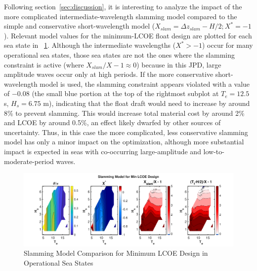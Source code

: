 Following section~\ref{sec:discussion}, it is interesting to analyze the impact of the more complicated intermediate-wavelength slamming model compared to the simple and conservative short-wavelength model ($X_{slam}=\Delta z_{slam}-H/2; X^*=-1$).
Relevant model values for the minimum-LCOE float design are plotted for each sea state in \figureautorefname~\ref{fig:slamming-validation}.
Although the intermediate wavelengths ($X^*>-1$) occur for many operational sea states, those sea states are not the ones where the slamming constraint is active (where $X_{slam}/X-1 \approx 0$) because in this JPD, large amplitude waves occur only at high periods.
If the more conservative short-wavelength model is used, the slamming constraint appears violated with a value of $-0.08$ (the small blue portion at the top of the rightmost subplot at $T_e=12.5$ s, $H_s=6.75$ m), indicating that the float draft would need to increase by around 8\% to prevent slamming.
This would increase total material cost by around 2\% and LCOE by around 0.5\%, an effect likely dwarfed by other sources of uncertainty.
Thus, in this case the more complicated, less conservative slamming model has only a minor impact on the optimization, although more substantial impact is expected in seas with co-occurring large-amplitude and low-to-moderate-period waves. 
\begin{figure}
    \centering
    \includegraphics[width=1\linewidth]{figs/slam_validation.pdf}
    \caption{Slamming Model Comparison for Minimum LCOE Design in Operational Sea States}
    \label{fig:slamming-validation}
\end{figure}



\clearpage

